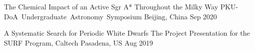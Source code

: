 


\begin{cventries}
	
	
	\cventry
	{The Chemical Impact of an Active Sgr A* Throughout the Milky Way} %
	{PKU-DoA Undergraduate Astronomy Symposium} %
	{Beijing, China} %
	{Sep 2020} %
	{}

	\cventry
	{A Systematic Search for Periodic White Dwarfs} %
	{The Project Presentation for the SURF Program, Caltech} %
	{Pasadena, US} %
	{Aug 2019} %
	{}

\end{cventries}